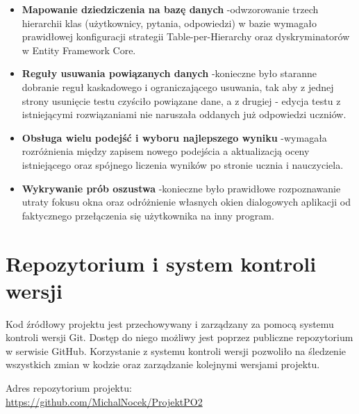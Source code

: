 \begin{itemize}
  \item \textbf{Mapowanie dziedziczenia na bazę danych} -odwzorowanie trzech hierarchii klas
        (użytkownicy, pytania, odpowiedzi) w bazie wymagało prawidłowej konfiguracji strategii
        Table-per-Hierarchy oraz dyskryminatorów w Entity Framework Core.

  \item \textbf{Reguły usuwania powiązanych danych} -konieczne było staranne dobranie reguł
        kaskadowego i ograniczającego usuwania, tak aby z jednej strony usunięcie testu czyściło
        powiązane dane, a z drugiej - edycja testu z istniejącymi rozwiązaniami nie naruszała
        oddanych już odpowiedzi uczniów.

  \item \textbf{Obsługa wielu podejść i wyboru najlepszego wyniku} -wymagała rozróżnienia między
        zapisem nowego podejścia a aktualizacją oceny istniejącego oraz spójnego liczenia wyników
        po stronie ucznia i nauczyciela.

  \item \textbf{Wykrywanie prób oszustwa} -konieczne było prawidłowe rozpoznawanie utraty fokusu
        okna oraz odróżnienie własnych okien dialogowych aplikacji od faktycznego przełączenia się
        użytkownika na inny program.
\end{itemize}

\section{Repozytorium i system kontroli wersji}
\label{sec:repozytorium}

Kod źródłowy projektu jest przechowywany i zarządzany za pomocą systemu kontroli wersji Git. Dostęp
do niego możliwy jest poprzez publiczne repozytorium w serwisie GitHub. Korzystanie z systemu
kontroli wersji pozwoliło na śledzenie wszystkich zmian w kodzie oraz zarządzanie kolejnymi wersjami
projektu.

\noindent Adres repozytorium projektu:\\
\url{https://github.com/MichalNocek/ProjektPO2}
